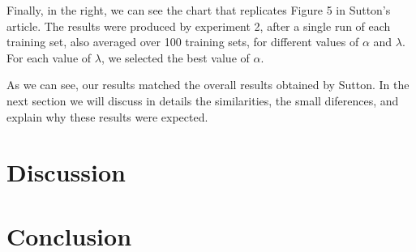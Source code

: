 \documentclass{article}
\begin{document}
Finally, in the right, we can see the chart that replicates Figure 5 in Sutton's article.
The results were produced by experiment 2, after a single run of each training set, also averaged over 100 training sets, for different values of $\alpha$ and $\lambda$.
For each value of $\lambda$, we selected the best value of $\alpha$.

As we can see, our results matched the overall results obtained by Sutton.
In the next section we will discuss in details the similarities, the small diferences, and explain why these results were expected.


\section{Discussion}
\label{sec:discussion}
\lipsum[2]
\lipsum[3]

\lipsum[2]
\lipsum[3]


\section{Conclusion}
\label{sec:conclusion}
\lipsum[2]
\lipsum[3]



\end{document}
